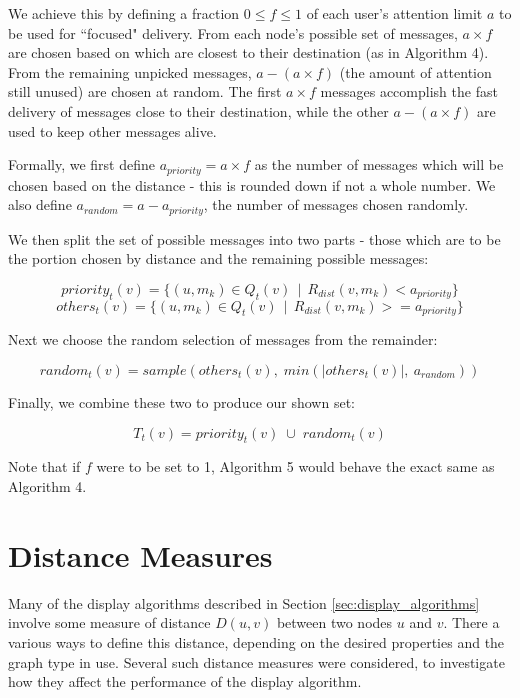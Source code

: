 \documentclass[bsc,frontabs,twoside,singlespacing,parskip,deptreport]{infthesis}     %
\begin{document}
We achieve this by defining a fraction $0 \le f \le 1$ of each user's attention limit $a$ to be used for ``focused" delivery. From each node's possible set of messages, $a \times f$ are chosen based on which are closest to their destination (as in Algorithm 4). From the remaining unpicked messages, $a - (a \times f)$ (the amount of attention still unused) are chosen at random. The first $a \times f$ messages accomplish the fast delivery of messages close to their destination, while the other $a - (a \times f)$ are used to keep other messages alive.

Formally, we first define $a_{priority} = a \times f$ as the number of messages which will be chosen based on the distance - this is rounded down if not a whole number. We also define $a_{random} = a - a_{priority}$, the number of messages chosen randomly.

We then split the set of possible messages into two parts - those which are to be the portion chosen by distance and the remaining possible messages:

\begin{equation}
priority_{t}(v) = \{ (u, m_{k}) \in Q_{t}(v) \:\: | \:\: R_{dist}(v, m_{k}) < a_{priority} \}
\end{equation}
\begin{equation}
others_{t}(v) = \{ (u, m_{k}) \in Q_{t}(v) \:\: | \:\: R_{dist}(v, m_{k}) >= a_{priority} \}
\end{equation}

Next we choose the random selection of messages from the remainder:

\begin{equation}
random_{t}(v) = \mathit{sample}(others_{t}(v), \; \mathit{min}(|others_{t}(v)|, \: a_{random}))
\end{equation}

Finally, we combine these two to produce our shown set:

\begin{equation}
T_{t}(v) = priority_{t}(v) \; \cup \; random_{t}(v)
\end{equation}

Note that if $f$ were to be set to 1, Algorithm 5 would behave the exact same as Algorithm 4.


\section{Distance Measures} \label{sec:distance_measures}
Many of the display algorithms described in Section \ref{sec:display_algorithms} involve some measure of distance $D(u, v)$ between two nodes $u$ and $v$. There a various ways to define this distance, depending on the desired properties and the graph type in use. Several such distance measures were considered, to investigate how they affect the performance of the display algorithm.
\end{document}
